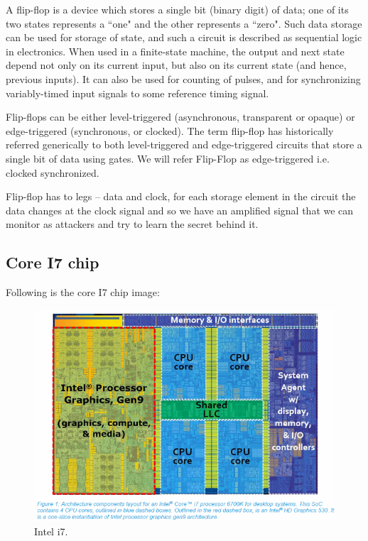 A flip-flop is a device which stores a single bit (binary digit) of data; one of
its two states represents a ``one" and the other represents a ``zero". Such data
storage can be used for storage of state, and such a circuit is described as
sequential logic in electronics. When used in a finite-state machine, the output
and next state depend not only on its current input, but also on its current
state (and hence, previous inputs). It can also be used for counting of pulses,
and for synchronizing variably-timed input signals to some reference timing
signal.

Flip-flops can be either level-triggered (asynchronous, transparent or opaque)
or edge-triggered (synchronous, or clocked). The term flip-flop has historically
referred generically to both level-triggered and edge-triggered circuits that
store a single bit of data using gates. We will refer Flip-Flop as
edge-triggered i.e. clocked synchronized.

Flip-flop has to legs – data and clock, for each storage element in the circuit
the data changes at the clock signal and so we have an amplified signal that we
can monitor as attackers and try to learn the secret behind it.

 \subsection { Core I7 chip }
 
Following is the core I7 chip image:

\begin{figure}[!ht]
	\centering
	\includegraphics{images/i7.png}
	\caption{Intel i7.} \label{fig:i7}
\end{figure}

